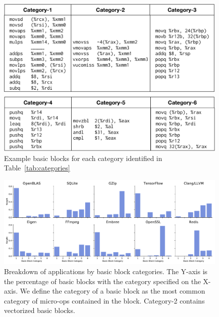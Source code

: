 \begin{figure}[th]
\begin{center}
\includegraphics[width=\columnwidth]{figures/examples.pdf}
\caption{Example basic blocks for each category identified in Table~\ref{tab:categories}}
\label{fig:examples}
\end{center}
\end{figure}

\begin{figure}[h]
\includegraphics[width=\textwidth]{figures/apps-vs-clusters.pdf}
\caption{Breakdown of applications by basic block categories. The Y-axis is the percentage of basic blocks with the category specified on the X-axis. We define the category of a basic block as the most common category of micro-ops contained in the block.
Category-2 contains vectorized basic blocks.}
\label{fig:apps_vs_clusters}
\end{figure}